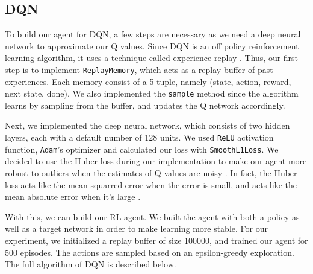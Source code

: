 \documentclass{article}
\begin{document}
\subsection{DQN}
To build our agent for DQN, a few steps are necessary as we need a deep neural
network to approximate our Q values. Since DQN is an off policy reinforcement
learning algorithm, it uses a technique called experience replay
\cite{replay,learning_control}. Thus, our first step is to implement
\verb+ReplayMemory+, which acts as a replay buffer of past experiences. Each
memory consist of a 5-tuple, namely (state, action, reward, next state, done).
We also implemented the \verb+sample+ method since the algorithm learns by
sampling from the buffer, and updates the Q network accordingly.

Next, we implemented the deep neural network, which consists of two hidden
layers, each with a default number of 128 units. We used \verb+ReLU+ activation
function, \verb+Adam+'s optimizer and calculated our loss with
\verb+SmoothL1Loss+. We decided to use the Huber loss during our implementation
to make our agent more robust to outliers when the estimates of Q values are
noisy \cite{noise}. In fact, the Huber loss acts like the mean squarred error
when the error is small, and acts like the mean absolute error when it's large
\cite{hubert}.

With this, we can build our RL agent. We built the agent with both a policy as
well as a target network in order to make learning more stable. For our
experiment, we initialized a replay buffer of size 100000, and trained our
agent for 500 episodes. The actions are sampled based on an epsilon-greedy
exploration. The full algorithm of DQN is described below.
\end{document}
